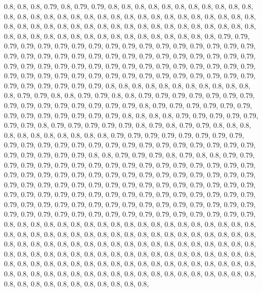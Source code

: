 \documentclass[11pt,]{article}
\begin{document}
0.8, 0.8, 0.8, 0.79, 0.8, 0.79, 0.79, 0.8, 0.8, 0.8, 0.8, 0.8, 0.8, 0.8,
0.8, 0.8, 0.8, 0.8, 0.8, 0.8, 0.8, 0.8, 0.8, 0.8, 0.8, 0.8, 0.8, 0.8,
0.8, 0.8, 0.8, 0.8, 0.8, 0.8, 0.8, 0.8, 0.8, 0.8, 0.8, 0.8, 0.8, 0.8,
0.8, 0.8, 0.8, 0.8, 0.8, 0.8, 0.8, 0.8, 0.8, 0.8, 0.8, 0.8, 0.8, 0.8,
0.8, 0.8, 0.8, 0.8, 0.8, 0.8, 0.8, 0.8, 0.8, 0.8, 0.8, 0.8, 0.8, 0.8,
0.8, 0.8, 0.79, 0.79, 0.79, 0.79, 0.79, 0.79, 0.79, 0.79, 0.79, 0.79,
0.79, 0.79, 0.79, 0.79, 0.79, 0.79, 0.79, 0.79, 0.79, 0.79, 0.79, 0.79,
0.79, 0.79, 0.79, 0.79, 0.79, 0.79, 0.79, 0.79, 0.79, 0.79, 0.79, 0.79,
0.79, 0.79, 0.79, 0.79, 0.79, 0.79, 0.79, 0.79, 0.79, 0.79, 0.79, 0.79,
0.79, 0.79, 0.79, 0.79, 0.79, 0.79, 0.79, 0.79, 0.79, 0.79, 0.79, 0.79,
0.79, 0.79, 0.79, 0.79, 0.79, 0.79, 0.79, 0.79, 0.79, 0.79, 0.8, 0.8,
0.8, 0.8, 0.8, 0.8, 0.8, 0.8, 0.8, 0.8, 0.8, 0.8, 0.79, 0.79, 0.8, 0.8,
0.79, 0.79, 0.8, 0.8, 0.79, 0.79, 0.79, 0.79, 0.79, 0.79, 0.79, 0.79,
0.79, 0.79, 0.79, 0.79, 0.79, 0.79, 0.79, 0.8, 0.79, 0.79, 0.79, 0.79,
0.79, 0.79, 0.79, 0.79, 0.79, 0.79, 0.79, 0.79, 0.79, 0.8, 0.8, 0.8,
0.8, 0.79, 0.79, 0.79, 0.79, 0.79, 0.79, 0.79, 0.8, 0.79, 0.79, 0.79,
0.79, 0.79, 0.8, 0.79, 0.8, 0.79, 0.79, 0.8, 0.8, 0.8, 0.8, 0.8, 0.8,
0.8, 0.8, 0.8, 0.8, 0.8, 0.79, 0.79, 0.79, 0.79, 0.79, 0.79, 0.79, 0.79,
0.79, 0.79, 0.79, 0.79, 0.79, 0.79, 0.79, 0.79, 0.79, 0.79, 0.79, 0.79,
0.79, 0.79, 0.79, 0.79, 0.79, 0.79, 0.79, 0.79, 0.8, 0.8, 0.79, 0.79,
0.79, 0.8, 0.79, 0.8, 0.8, 0.79, 0.79, 0.79, 0.79, 0.79, 0.79, 0.79,
0.79, 0.79, 0.79, 0.79, 0.79, 0.79, 0.79, 0.79, 0.79, 0.79, 0.79, 0.79,
0.79, 0.79, 0.79, 0.79, 0.79, 0.79, 0.79, 0.79, 0.79, 0.79, 0.79, 0.79,
0.79, 0.79, 0.79, 0.79, 0.79, 0.79, 0.79, 0.79, 0.79, 0.79, 0.79, 0.79,
0.79, 0.79, 0.79, 0.79, 0.79, 0.79, 0.79, 0.79, 0.79, 0.79, 0.79, 0.79,
0.79, 0.79, 0.79, 0.79, 0.79, 0.79, 0.79, 0.79, 0.79, 0.79, 0.79, 0.79,
0.79, 0.79, 0.79, 0.79, 0.79, 0.79, 0.79, 0.79, 0.79, 0.79, 0.79, 0.79,
0.79, 0.79, 0.79, 0.79, 0.79, 0.79, 0.79, 0.79, 0.79, 0.79, 0.79, 0.79,
0.79, 0.8, 0.8, 0.8, 0.8, 0.8, 0.8, 0.8, 0.8, 0.8, 0.8, 0.8, 0.8, 0.8,
0.8, 0.8, 0.8, 0.8, 0.8, 0.8, 0.8, 0.8, 0.8, 0.8, 0.8, 0.8, 0.8, 0.8,
0.8, 0.8, 0.8, 0.8, 0.8, 0.8, 0.8, 0.8, 0.8, 0.8, 0.8, 0.8, 0.8, 0.8,
0.8, 0.8, 0.8, 0.8, 0.8, 0.8, 0.8, 0.8, 0.8, 0.8, 0.8, 0.8, 0.8, 0.8,
0.8, 0.8, 0.8, 0.8, 0.8, 0.8, 0.8, 0.8, 0.8, 0.8, 0.8, 0.8, 0.8, 0.8,
0.8, 0.8, 0.8, 0.8, 0.8, 0.8, 0.8, 0.8, 0.8, 0.8, 0.8, 0.8, 0.8, 0.8,
0.8, 0.8, 0.8, 0.8, 0.8, 0.8, 0.8, 0.8, 0.8, 0.8, 0.8, 0.8, 0.8, 0.8,
0.8, 0.8, 0.8, 0.8, 0.8, 0.8, 0.8, 0.8, 0.8, 0.8, 0.8, 0.8, 0.8, 0.8,
0.8, 0.8, 0.8, 0.8, 0.8, 0.8, 0.8, 0.8, 0.8, 0.8, 0.8, 0.8, 0.8, 0.8,
\end{document}
